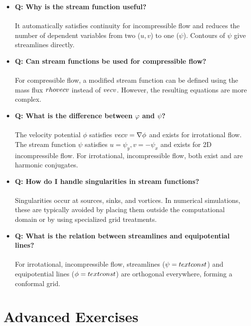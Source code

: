 \begin{itemize}
\item \textbf{Q: Why is the stream function useful?} \\\\
It automatically satisfies continuity for incompressible flow and reduces the number of dependent variables from two ($u,v$) to one ($\psi$). Contours of $\psi$ give streamlines directly.

\item \textbf{Q: Can stream functions be used for compressible flow?} \\\\
For compressible flow, a modified stream function can be defined using the mass flux $\\rho \\vec{v}$ instead of $\\vec{v}$. However, the resulting equations are more complex.

\item \textbf{Q: What is the difference between $\varphi$ and $\psi$?} \\\\
The velocity potential $\phi$ satisfies $\\vec{v} = \nabla\phi$ and exists for irrotational flow. The stream function $\psi$ satisfies $u = \psi_y, v = -\psi_x$ and exists for 2D incompressible flow. For irrotational, incompressible flow, both exist and are harmonic conjugates.

\item \textbf{Q: How do I handle singularities in stream functions?} \\\\
Singularities occur at sources, sinks, and vortices. In numerical simulations, these are typically avoided by placing them outside the computational domain or by using specialized grid treatments.

\item \textbf{Q: What is the relation between streamlines and equipotential lines?} \\\\
For irrotational, incompressible flow, streamlines ($\psi = \\text{const}$) and equipotential lines ($\phi = \\text{const}$) are orthogonal everywhere, forming a conformal grid.
\end{itemize}

\section{Advanced Exercises}

